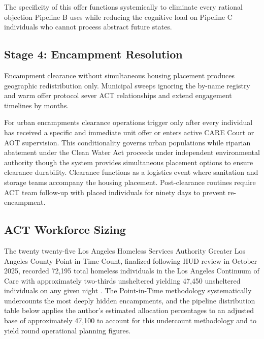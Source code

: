 \documentclass[12pt, letterpaper]{article}
\begin{document}
The specificity of this offer functions systemically to eliminate every rational objection Pipeline B uses while reducing the cognitive load on Pipeline C individuals who cannot process abstract future states.

\subsection{Stage 4: Encampment Resolution}

Encampment clearance without simultaneous housing placement produces geographic redistribution only. Municipal sweeps ignoring the by-name registry and warm offer protocol sever ACT relationships and extend engagement timelines by months.

For urban encampments clearance operations trigger only after every individual has received a specific and immediate unit offer or enters active CARE Court or AOT supervision. This conditionality governs urban populations while riparian abatement under the Clean Water Act proceeds under independent environmental authority though the system provides simultaneous placement options to ensure clearance durability. Clearance functions as a logistics event where sanitation and storage teams accompany the housing placement. Post-clearance routines require ACT team follow-up with placed individuals for ninety days to prevent re-encampment.

\subsection{ACT Workforce Sizing}

The twenty twenty-five Los Angeles Homeless Services Authority Greater Los Angeles County Point-in-Time Count, finalized following HUD review in October 2025, recorded 72,195 total homeless individuals in the Los Angeles Continuum of Care with approximately two-thirds unsheltered yielding 47,450 unsheltered individuals on any given night \citep{lahsa_count_2025}. The Point-in-Time methodology systematically undercounts the most deeply hidden encampments, and the pipeline distribution table below applies the author's estimated allocation percentages to an adjusted base of approximately 47,100 to account for this undercount methodology and to yield round operational planning figures.
\end{document}
